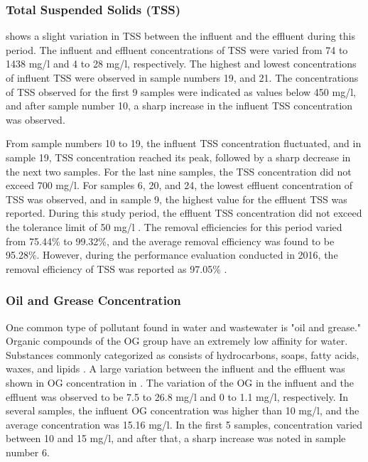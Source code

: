 


\subsubsection{Total Suspended Solids (TSS)}
 shows a slight variation in \ac{TSS} between the influent and the effluent during this period. The influent and effluent concentrations of \ac{TSS} were varied from 74 to 1438 mg/l and 4 to 28 mg/l, respectively. The highest and lowest concentrations of influent \ac{TSS} were observed in sample numbers 19, and 21. The concentrations of \ac{TSS} observed for the first 9 samples were indicated as values below 450 mg/l, and after sample number 10, a sharp increase in the influent \ac{TSS} concentration was observed.

From sample numbers 10 to 19, the influent \ac{TSS} concentration fluctuated, and in sample 19, \ac{TSS} concentration reached its peak, followed by a sharp decrease in the next two samples. For the last nine samples, the \ac{TSS} concentration did not exceed 700 mg/l. For samples 6, 20, and 24, the lowest effluent concentration of \ac{TSS} was observed, and in sample 9, the highest value for the effluent \ac{TSS} was reported. During this study period, the effluent \ac{TSS} concentration did not exceed the tolerance limit of 50 mg/l \cite{CEA2022}. The removal efficiencies for this period varied from 75.44\% to 99.32\%, and the average removal efficiency was found to be 95.28\%. However, during the performance evaluation conducted in 2016, the removal efficiency of \ac{TSS} was reported as 97.05\% \cite{Danushika2016}.



\subsubsection{Oil and Grease Concentration}

One common type of pollutant found in water and wastewater is "oil and grease." Organic compounds of the \ac{OG} group have an extremely low affinity for water. Substances commonly categorized as consists of hydrocarbons, soaps, fatty acids, waxes, and lipids \cite{Pintor2016}. A large variation between the influent and the effluent was shown in \ac{OG} concentration in . The variation of the \ac{OG} in the influent and the effluent was observed to be 7.5 to 26.8 mg/l and 0 to 1.1 mg/l, respectively. In several samples, the influent \ac{OG} concentration was higher than 10 mg/l, and the average concentration was 15.16 mg/l. In the first 5 samples, concentration varied between 10 and 15 mg/l, and after that, a sharp increase was noted in sample number 6.

